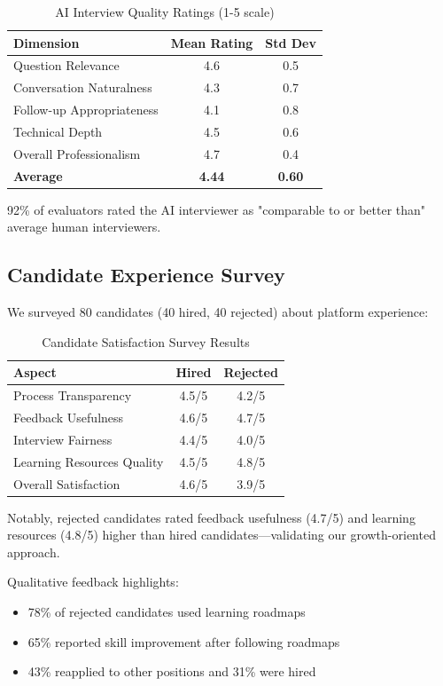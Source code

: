\documentclass[conference]{IEEEtran}
\begin{document}
\begin{table}[h]
\centering
\caption{AI Interview Quality Ratings (1-5 scale)}
\label{tab:interview_quality}
\begin{tabular}{@{}lcc@{}}
\toprule
\textbf{Dimension} & \textbf{Mean Rating} & \textbf{Std Dev} \\ \midrule
Question Relevance & 4.6 & 0.5 \\
Conversation Naturalness & 4.3 & 0.7 \\
Follow-up Appropriateness & 4.1 & 0.8 \\
Technical Depth & 4.5 & 0.6 \\
Overall Professionalism & 4.7 & 0.4 \\ \midrule
\textbf{Average} & \textbf{4.44} & \textbf{0.60} \\ \bottomrule
\end{tabular}
\end{table}

92\% of evaluators rated the AI interviewer as "comparable to or better than" average human interviewers.

\subsection{Candidate Experience Survey}

We surveyed 80 candidates (40 hired, 40 rejected) about platform experience:

\begin{table}[h]
\centering
\caption{Candidate Satisfaction Survey Results}
\label{tab:candidate_survey}
\begin{tabular}{@{}lcc@{}}
\toprule
\textbf{Aspect} & \textbf{Hired} & \textbf{Rejected} \\ \midrule
Process Transparency & 4.5/5 & 4.2/5 \\
Feedback Usefulness & 4.6/5 & 4.7/5 \\
Interview Fairness & 4.4/5 & 4.0/5 \\
Learning Resources Quality & 4.5/5 & 4.8/5 \\
Overall Satisfaction & 4.6/5 & 3.9/5 \\ \bottomrule
\end{tabular}
\end{table}

Notably, rejected candidates rated feedback usefulness (4.7/5) and learning resources (4.8/5) higher than hired candidates—validating our growth-oriented approach.

Qualitative feedback highlights:
\begin{itemize}
    \item 78\% of rejected candidates used learning roadmaps
    \item 65\% reported skill improvement after following roadmaps
    \item 43\% reapplied to other positions and 31\% were hired
\end{itemize}
\end{document}
